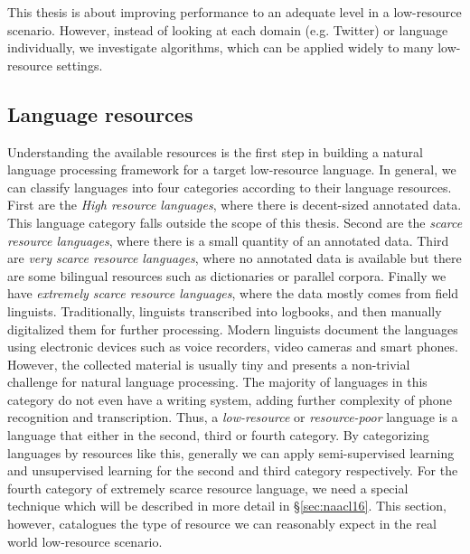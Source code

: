 \documentclass[12pt,twoside,final,hidelinks]{ltthesis}
\theoremstyle{definition}
\begin{document}
This thesis is about improving  performance to an adequate level in a low-resource scenario. However, instead of looking at each domain (e.g. Twitter) or language individually, we investigate algorithms, which can be applied widely to many low-resource settings.   

\subsection{Language resources}
Understanding the available resources is the first step in building a natural language processing framework for a target 
low-resource language. In general, we can classify languages into four categories according to their language resources. First are the \emph{High resource languages}, where there is decent-sized annotated data. This language 
category falls outside the scope of this thesis. Second are the \emph{scarce resource languages}, where there is a small quantity of an annotated data. Third are \emph{very scarce resource languages}, where no annotated data is available but there are some bilingual resources such as dictionaries or 
parallel corpora. Finally we have \emph{extremely scarce resource languages}, where the data mostly comes from field linguists. Traditionally, linguists transcribed into logbooks, and then manually digitalized them for further processing. Modern linguists document the languages using electronic devices such as voice recorders, video cameras and smart phones. However, the collected material is usually tiny and presents a non-trivial challenge for natural language processing. The majority of languages in this category do not even have a writing system, adding further complexity of phone recognition and transcription. Thus, a \textit{low-resource} or \textit{resource-poor} language is a language that either in the second, third or fourth category. By categorizing languages by resources like this, generally we can apply semi-supervised learning and unsupervised learning for the second and third category respectively. For the fourth category of extremely scarce resource language, we need a special technique which will be described in more detail in \S\ref{sec:naacl16}. This section, however, catalogues the type of resource we can reasonably expect in the real world low-resource scenario. 
\end{document}
